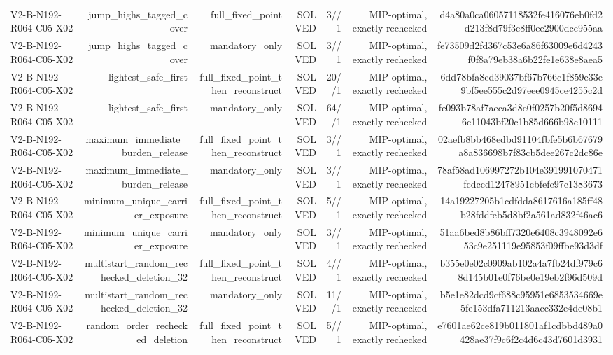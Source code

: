 {\begin{longtable}{lrrrrrr}
V2-B-N192-R064-C05-X02 & jump\_highs\_tagged\_cover & full\_fixed\_point & SOLVED & 3//1 & MIP-optimal, exactly rechecked & d4a80a0ca06057118532fe416076eb0fd2d213f8d79f3c8ff0ee2900dce955aa \\
V2-B-N192-R064-C05-X02 & jump\_highs\_tagged\_cover & mandatory\_only & SOLVED & 3//1 & MIP-optimal, exactly rechecked & fe73509d2fd367c53e6a86f63009e6d4243f0f8a79eb38a6b22fe1e638e8aea5 \\
V2-B-N192-R064-C05-X02 & lightest\_safe\_first & full\_fixed\_point\_then\_reconstruct & SOLVED & 20//1 & MIP-optimal, exactly rechecked & 6dd78bfa8cd39037bf67b766c1f859e33e9bf5ee555c2d97eee0945ce4255c2d \\
V2-B-N192-R064-C05-X02 & lightest\_safe\_first & mandatory\_only & SOLVED & 64//1 & MIP-optimal, exactly rechecked & fe093b78af7aeca3d8e0f0257b20f5d86946c11043bf20c1b85d666b98c10111 \\
V2-B-N192-R064-C05-X02 & maximum\_immediate\_burden\_release & full\_fixed\_point\_then\_reconstruct & SOLVED & 3//1 & MIP-optimal, exactly rechecked & 02aefb8bb468edbd91104fbfe5b6b67679a8a836698b7f83cb5dee267c2dc86e \\
V2-B-N192-R064-C05-X02 & maximum\_immediate\_burden\_release & mandatory\_only & SOLVED & 3//1 & MIP-optimal, exactly rechecked & 78af58ad106997272b104e391991070471fcdccd12478951cbfefc97c1383673 \\
V2-B-N192-R064-C05-X02 & minimum\_unique\_carrier\_exposure & full\_fixed\_point\_then\_reconstruct & SOLVED & 5//1 & MIP-optimal, exactly rechecked & 14a19227205b1cdfdda8617616a185ff48b28fddfeb5d8bf2a561ad832f46ac6 \\
V2-B-N192-R064-C05-X02 & minimum\_unique\_carrier\_exposure & mandatory\_only & SOLVED & 3//1 & MIP-optimal, exactly rechecked & 51aa6bed8b86bff7320e6408c3948092e653c9e251119e95853f09ffbe93d3df \\
V2-B-N192-R064-C05-X02 & multistart\_random\_rechecked\_deletion\_32 & full\_fixed\_point\_then\_reconstruct & SOLVED & 4//1 & MIP-optimal, exactly rechecked & b355e0e02c0909ab102a4a7fb24df979c68d145b01e0f76be0e19eb2f96d509d \\
V2-B-N192-R064-C05-X02 & multistart\_random\_rechecked\_deletion\_32 & mandatory\_only & SOLVED & 11//1 & MIP-optimal, exactly rechecked & b5e1e82dcd9cf688c95951e6853534669e5fe153dfa711213aacc332e4de08b1 \\
V2-B-N192-R064-C05-X02 & random\_order\_rechecked\_deletion & full\_fixed\_point\_then\_reconstruct & SOLVED & 5//1 & MIP-optimal, exactly rechecked & e7601ae62ce819b011801af1cdbbd489a0428ae37f9c6f2c4d6c43d7601d3931 \\

\end{longtable}}
